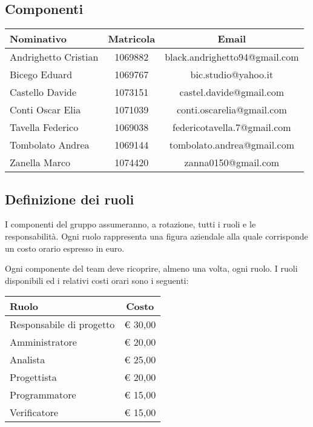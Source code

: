 \documentclass[../PianoProgetto.tex]{subfiles}
\begin{document}
	\clearpage
	
	\subsection{Componenti}
	
		\begin{table}[h]
		\centering
	
		\begin{tabular}{lcc}
			\toprule
			Nominativo & Matricola & Email \\
			\midrule
			Andrighetto Cristian & 1069882 & black.andrighetto94@gmail.com \\
			\midrule
			Bicego Eduard& 1069767 & bic.studio@yahoo.it  \\
			\midrule
			Castello Davide	& 1073151 &	 castel.davide@gmail.com\\
			\midrule
			Conti Oscar Elia & 1071039 & conti.oscarelia@gmail.com \\
			\midrule
			Tavella Federico & 1069038 & federicotavella.7@gmail.com\\
			\midrule
			Tombolato Andrea & 1069144 & tombolato.andrea@gmail.com	 \\
			\midrule
			Zanella Marco & 1074420 & zanna0150@gmail.com \\
			\bottomrule
		\end{tabular}
		
		\end{table}		
		

	\subsection{Definizione dei ruoli}
	I componenti del gruppo \leaf assumeranno, a rotazione, tutti i ruoli e le responsabilità. Ogni ruolo rappresenta una figura aziendale alla quale corrisponde un costo orario espresso in euro.

Ogni componente del team deve ricoprire, almeno una volta, ogni ruolo.
I ruoli disponibili ed i relativi costi orari sono i seguenti:

	\begin{table}[h]
		\centering
	
		\begin{tabular}{lc}
			\toprule
			Ruolo & Costo \\
			\midrule
			Responsabile di progetto & \euro{} 30,00	 \\
			\midrule
			Amministratore & \euro{} 20,00	 \\
			\midrule
			Analista & \euro{} 25,00	 \\
			\midrule
			Progettista & \euro{} 20,00	 \\
			\midrule
			Programmatore & \euro{} 15,00	 \\
			\midrule
			Verificatore & \euro{} 15,00	 \\
			\bottomrule
		\end{tabular}
		
		\end{table}		
\end{document}
